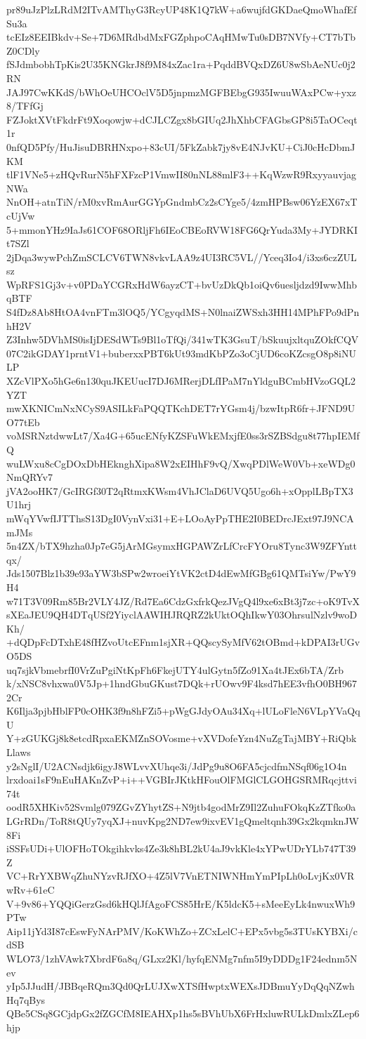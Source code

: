 pr89uJzPlzLRdM2ITvAMThyG3RcyUP48K1Q7kW+a6wujfdGKDaeQmoWhafEfSu3a
tcEIz8EEIBkdv+Se+7D6MRdbdMxFGZphpoCAqHMwTu0sDB7NVfy+CT7bTbZ0CDly
fSJdmbobhTpKis2U35KNGkrJ8f9M84xZac1ra+PqddBVQxDZ6U8wSbAeNUc0j2RN
JAJ97CwKKdS/bWhOeUHCOclV5D5jnpmzMGFBEbgG935IwuuWAxPCw+yxz8/TFfGj
FZJoktXVtFkdrFt9Xoqowjw+dCJLCZgx8bGIUq2JhXhbCFAGbsGP8i5TaOCeqt1r
0nfQD5Pfy/HuJisuDBRHNxpo+83cUI/5FkZabk7jy8vE4NJvKU+CiJ0cHcDbmJKM
tlF1VNe5+zHQvRurN5hFXFzcP1VmwII80nNL88mlF3++KqWzwR9RxyyauvjagNWa
NnOH+atnTiN/rM0xvRmAurGGYpGndmbCz2sCYge5/4zmHPBsw06YzEX67xTcUjVw
5+mmonYHz9IaJs61COF68ORljFh6IEoCBEoRVW18FG6QrYuda3My+JYDRKIt7SZl
2jDqa3wywPchZmSCLCV6TWN8vkvLAA9z4UI3RC5VL//Yceq3Io4/i3xs6czZULsz
WpRFS1Gj3v+v0PDaYCGRxHdW6ayzCT+bvUzDkQb1oiQv6uesljdzd9IwwMhbqBTF
S4fDz8Ab8HtOA4vnFTm3lOQ5/YCgyqdMS+N0lnaiZWSxh3HH14MPhFPo9dPnhH2V
Z3Inhw5DVhMS0isIjDESdWTs9Bl1oTfQi/341wTK3GsuT/bSkuujxltquZOkfCQV
07C2ikGDAY1prntV1+buberxxPBT6kUt93mdKbPZo3oCjUD6coKZcsgO8p8iNULP
XZcVlPXo5hGe6n130quJKEUucI7DJ6MRerjDLfIPaM7nYldguBCmbHVzoGQL2YZT
mwXKNICmNxNCyS9ASILkFaPQQTKchDET7rYGsm4j/bzwItpR6fr+JFND9UO77tEb
voMSRNztdwwLt7/Xa4G+65ucENfyKZSFuWkEMxjfE0ss3rSZBSdgu8t77hpIEMfQ
wuLWxu8cCgDOxDbHEknghXipa8W2xEIHhF9vQ/XwqPDlWeW0Vb+xeWDg0NmQRYv7
jVA2ooHK7/GcIRGf30T2qRtmxKWsm4VhJClaD6UVQ5Ugo6h+xOpplLBpTX3U1hrj
mWqYVwfIJTThsS13DgI0VynVxi31+E+LOoAyPpTHE2I0BEDrcJExt97J9NCAmJMs
5n4ZX/bTX9hzha0Jp7eG5jArMGsymxHGPAWZrLfCrcFYOru8Tync3W9ZFYnttqx/
Jds1507Blz1b39e93aYW3bSPw2wroeiYtVK2ctD4dEwMfGBg61QMTsiYw/PwY9H4
w71T3V09Rm85Br2VLY4JZ/Rd7Ea6CdzGxfrkQezJVgQ4l9xe6xBt3j7zc+oK9TvX
sXEaJEU9QH4DTqUSf2YiyclAAWIHJRQRZ2kUktOQhIkwY03OhrsulNzlv9woDKh/
+dQDpFcDTxhE48fHZvoUtcEFnm1sjXR+QQscySyMfV62tOBmd+kDPAI3rUGvO5DS
uq7sjkVbmebrfI0VrZuPgiNtKpFh6FkejUTY4ulGytn5fZo91Xa4tJEx6bTA/Zrb
k/xNSC8vhxwa0V5Jp+1hndGbuGKust7DQk+rUOwv9F4ksd7hEE3vfhO0BH9672Cr
K6Ilja3pjbHblFP0cOHK3f9n8hFZi5+pWgGJdyOAu34Xq+lULoFleN6VLpYVaQqU
Y+zGUKGj8k8etcdRpxaEKMZnSOVosme+vXVDofeYzn4NuZgTajMBY+RiQbkLlaws
y2sNglI/U2ACNsdjk6igyJ8WLvvXUhqe3i/JdPg9u8O6FA5cjcdfmNSqf06g1O4n
lrxdoai1sF9nEuHAKnZvP+i++VGBIrJKtkHFouOlFMGlCLGOHGSRMRqcjttvi74t
oodR5XHKiv52Svmlg079ZGvZYhytZS+N9jtb4godMrZ9Il2ZuhuFOkqKzZTfko0a
LGrRDn/ToR8tQUy7yqXJ+nuvKpg2ND7ew9ixvEV1gQmeltqnh39Gx2kqmknJW8Fi
iSSFsUDi+UlOFHoTOkgihkvks4Ze3k8hBL2kU4aJ9vkKle4xYPwUDrYLb747T39Z
VC+RrYXBWqZhuNYzvRJfXO+4Z5lV7VnETNIWNHmYmPIpLh0oLvjKx0VRwRv+61eC
V+9v86+YQQiGerzGsd6kHQlJfAgoFCS85HrE/K5ldcK5+sMeeEyLk4nwuxWh9PTw
Aip11jYd3I87cEswFyNArPMV/KoKWhZo+ZCxLelC+EPx5vbg5s3TUsKYBXi/cdSB
WLO73/1zhVAwk7XbrdF6a8q/GLxz2Kl/hyfqENMg7nfm5I9yDDDg1F24ednm5Nev
yIp5JJudH/JBBqeRQm3Qd0QrLUJXwXTSfHwptxWEXsJDBmuYyDqQqNZwhHq7qBys
QBe5CSq8GCjdpGx2fZGCfM8IEAHXp1hs5sBVhUbX6FrHxluwRULkDmlxZLep6hjp
